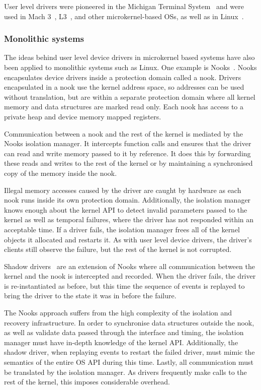 User level drivers were pioneered in the Michigan Terminal System~\cite{Boettner_Alexander_75} and were used in Mach 3~\cite{Accetta_BBGRTY_86, Forin_GB_91}, L3~\cite{Liedtke_BBHRS_91, Liedtke_93}, and other microkernel-based OSs, as well as in Linux~\cite{}.

\subsubsection{Monolithic systems}
The ideas behind user level device drivers in microkernel based systems have also been applied to monolithic systems such as Linux. One example is Nooks~\cite{Swift_BL_03}. Nooks encapsulates device drivers inside a protection domain called a nook. Drivers encapsulated in a nook use the kernel address space, so addresses can be used without translation, but are within a separate protection domain where all kernel memory and data structures are marked read only. Each nook has access to a private heap and device memory mapped registers. 

Communication between a nook and the rest of the kernel is mediated by the Nooks isolation manager. It intercepts function calls and ensures that the driver can read and write memory passed to it by reference. It does this by forwarding these reads and writes to the rest of the kernel or by maintaining a synchronised copy of the memory inside the nook. 

Illegal memory accesses caused by the driver are caught by hardware as each nook runs inside its own protection domain. Additionally, the isolation manager knows enough about the kernel API to detect invalid parameters passed to the kernel as well as temporal failures, where the driver has not responded within an acceptable time. If a driver fails, the isolation manager frees all of the kernel objects it allocated and restarts it. As with user level device drivers, the driver's clients still observe the failure, but the rest of the kernel is not corrupted. 

Shadow drivers~\cite{Swift_ABL_04} are an extension of Nooks where all communication between the kernel and the nook is intercepted and recorded. When the driver fails, the driver is re-instantiated as before, but this time the sequence of events is replayed to bring the driver to the state it was in before the failure. 

The Nooks approach suffers from the high complexity of the isolation and recovery infrastructure. In order to synchronise data structures outside the nook, as well as validate data passed through the interface and timing, the isolation manager must have in-depth knowledge of the kernel API. Additionally, the shadow driver, when replaying events to restart the failed driver, must mimic the semantics of the entire OS API during this time. Lastly, all communication must be translated by the isolation manager. As drivers frequently make calls to the rest of the kernel, this imposes considerable overhead.

